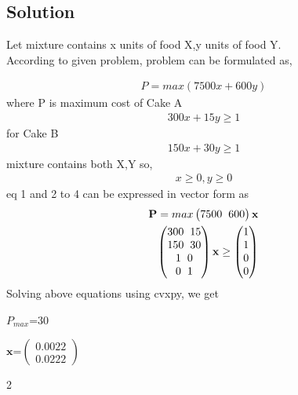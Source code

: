 \documentclass{article}
\newcommand{\myvec}[1]{\ensuremath{\begin{pmatrix}#1\end{pmatrix}}}
\let\vec\mathbf
\begin{document}
\begin{multicols}{2}
\section*{Solution}
\begin{flushleft}
Let mixture contains x units of food X,y units of food Y.\\
According to given problem, problem can be formulated as,\\
\end{flushleft}
\begin{align}
P=max(7500x+600y)
\end{align}
where P is maximum cost of Cake A
\begin{align}
300x+15y \geq1
\end{align}
for Cake B
\begin{align}
150x+30y \geq 1
\end{align}
mixture contains both X,Y so,
\begin{align}
x\geq0,y\geq0
\end{align}
eq 1 and 2 to 4 can be expressed in vector form as
\begin{align*}
\vec{P}=max\myvec{7500 \hspace{0.2cm}600}\vec{x}\\
\myvec{300 \hspace{0.2cm} 15\\
       150 \hspace{0.2cm} 30\\
       1 \hspace{0.2cm}0\\
       0 \hspace{0.2cm} 1}\vec{x}\geq \myvec{1 \\1\\0\\0}
\end{align*}
Solving above equations using cvxpy, we get\\
\begin{center}
$P_{max}$=30\\
\end{center}
\begin{center}
$\vec{x}$=$\myvec{0.0022\\0.0222}$
\end{center}
\end{multicols}{2}
\end{document}
